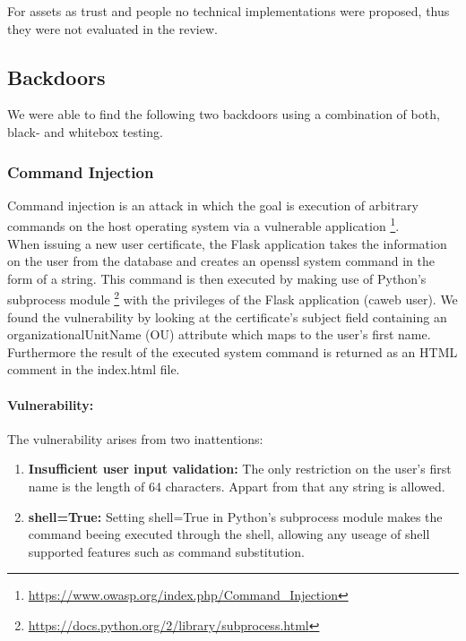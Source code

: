 \documentclass[english]{article}
\begin{document}
For assets as trust and people no technical implementations were proposed, thus they were not evaluated in the review.


\subsection{Backdoors}

We were able to find the following two backdoors using a combination of both, black- and whitebox testing.

\subsubsection{Command Injection}
Command injection is an attack in which the goal is execution of arbitrary commands on the host operating system via a vulnerable application \footnote{\url{https://www.owasp.org/index.php/Command_Injection}}.\\
 When issuing a new user certificate, the Flask application takes the information on the user from the database and creates an openssl system command in the form of a string. This command is then executed by making use of Python's subprocess module \footnote{\url{https://docs.python.org/2/library/subprocess.html}} with the privileges of the Flask application (caweb user). 
 We found the vulnerability by looking at the certificate's subject field containing an organizationalUnitName (OU) attribute which maps to the user's first name. Furthermore the result of the executed system command is returned as an HTML comment in the index.html file.
 
 \paragraph{Vulnerability:}
 The vulnerability arises from two inattentions:
\begin{enumerate}
\item \textbf{Insufficient user input validation:} The only restriction on the user's first name is the length of 64 characters. Appart from that any string is allowed.
\item \textbf{shell=True:} Setting shell=True in Python's subprocess module makes the command beeing executed through the shell, allowing any useage of shell supported features such as command substitution. 
\end{enumerate}
\end{document}
